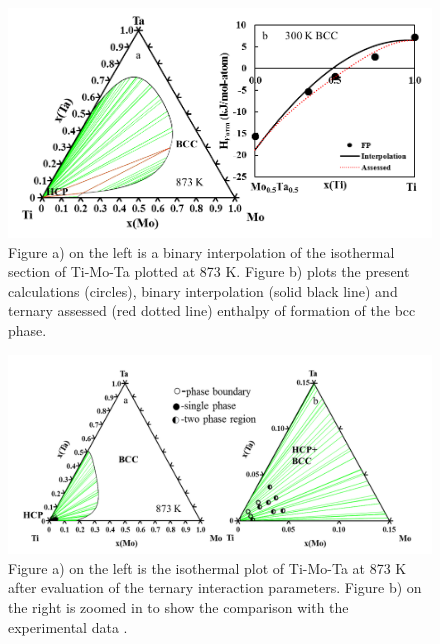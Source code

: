 \newpage
\begin{figure}[H]
	\centering
	\includegraphics[width=\textwidth]{Chapter-3/Figures/TiMoTa1.png}
	\caption{Figure a) on the left is a binary interpolation of the isothermal section of Ti-Mo-Ta plotted at 873 K. Figure b) plots the present calculations (circles), binary interpolation (solid black line) and ternary assessed (red dotted line) enthalpy of formation of the bcc phase.}
	\label{Ch3-figure:TiMoTa1}
\end{figure}

\newpage
\begin{figure}[H]
	\centering
	\includegraphics[width=\textwidth]{Chapter-3/Figures/TiMoTa2.png}
	\caption{Figure a) on the left is the isothermal plot of Ti-Mo-Ta at 873 K after evaluation of the ternary interaction parameters. Figure b) on the right is zoomed in to show the comparison with the experimental data \cite{Nikitin1971}.}
	\label{Ch3-figure:TiMoTa2}
\end{figure}

